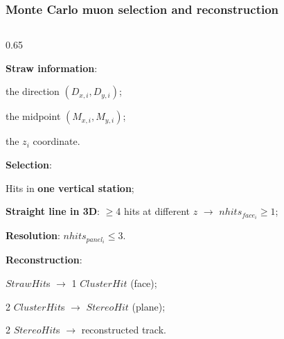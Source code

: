\documentclass{beamer}
\begin{document}
\begin{frame}
    \frametitle{Monte Carlo muon selection and reconstruction}
\vspace{-4.6mm}
    \begin{columns}
\begin{column}{0.65\framewidth}
   \setlength{\leftmargini}{1.2em}
   \begin{itemize}
{\footnotesize \item \textbf{Straw information}:}
\vspace{2mm}
\begin{itemize}
    {\footnotesize \item the direction $(D_{x,i},D_{y,i})$;
    \vspace{1mm}
    \item the midpoint $(M_{x,i},M_{y,i})$;
    \vspace{1mm}
    \item the $z_i$ coordinate.}
\end{itemize} 
\vspace{4mm}
 {\footnotesize
 \item \textbf{Selection}:}
 \vspace{2mm}
  \begin{itemize}
   {\footnotesize \item  Hits in \textbf{one vertical station};
   \vspace{1mm}
    \item \textbf{Straight line in 3D}: $\geq$4 hits at different $z$ $\rightarrow$ $nhits_{face_i}\geq 1$;
    \vspace{1mm}
    \item \textbf{Resolution}: $nhits_{panel_i}\leq 3$.}
    \end{itemize} 
    \vspace{4mm}
 {\footnotesize \item \textbf{Reconstruction}: }
 \vspace{2mm}
        \begin{itemize}
        {\footnotesize \item $StrawHit$s $\rightarrow$ 1 $ClusterHit$ (face);
        \vspace{1mm}
          \item 2 $ClusterHit$s $\rightarrow$ $StereoHit$ (plane);
          \vspace{1mm}
          \item 2 $StereoHit$s $\rightarrow$ reconstructed track.}
        \end{itemize}


\end{itemize}
\end{column}
\end{columns}
\end{frame}
\end{document}
